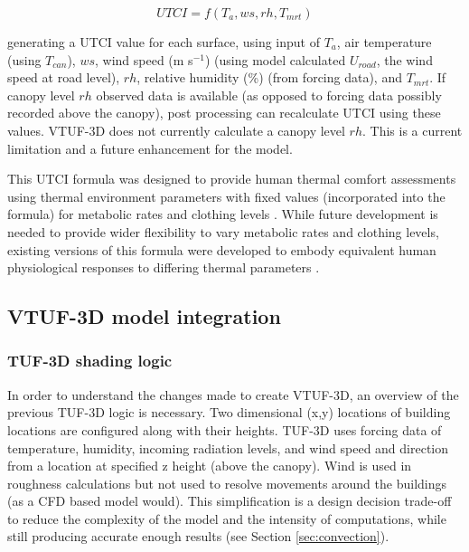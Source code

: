 \documentclass[final,3p,times,authoryear]{elsarticle}
\begin{document}
\begin{equation}\label{eq:utci}
  UTCI = f(T_{a}, ws, rh, T_{mrt})
\end{equation}

generating a UTCI value for each surface, using input of $T_{a}$, air temperature (using $T_{can}$), $ws$, wind speed (m s$^{-1}$) (using model calculated $U_{road}$, the wind speed at road level), $rh$, relative humidity (\%) (from forcing data), and $T_{mrt}$. If canopy level $rh$ observed data is available (as opposed to forcing data possibly recorded above the canopy), post processing can recalculate UTCI using these values. VTUF-3D does not currently calculate a canopy level $rh$. This is a current limitation and a future enhancement for the model.


This UTCI formula was designed to provide human thermal comfort assessments using thermal environment parameters with fixed values (incorporated into the formula) for metabolic rates and clothing levels \citep{Brode2012a}. While future development is needed to provide wider flexibility to vary metabolic rates and clothing levels, existing versions of this formula were developed to embody equivalent human physiological responses to differing thermal parameters \citep{Havenith2012,Fiala2012}.



\subsection{VTUF-3D model integration}\label{sec:integration}
\subsubsection{TUF-3D shading logic}\label{sec:existingshading}
In order to understand the changes made to create VTUF-3D, an overview of the previous TUF-3D logic is necessary. Two dimensional (x,y) locations of building locations are configured along with their heights. TUF-3D uses forcing data of temperature, humidity, incoming radiation levels, and wind speed and direction from a location at specified z height (above the canopy). Wind is used in roughness calculations but not used to resolve movements around the buildings (as a CFD based model would). This simplification is a design decision trade-off to reduce the complexity of the model and the intensity of computations, while still producing accurate enough results (see Section \ref{sec:convection}).
\end{document}
